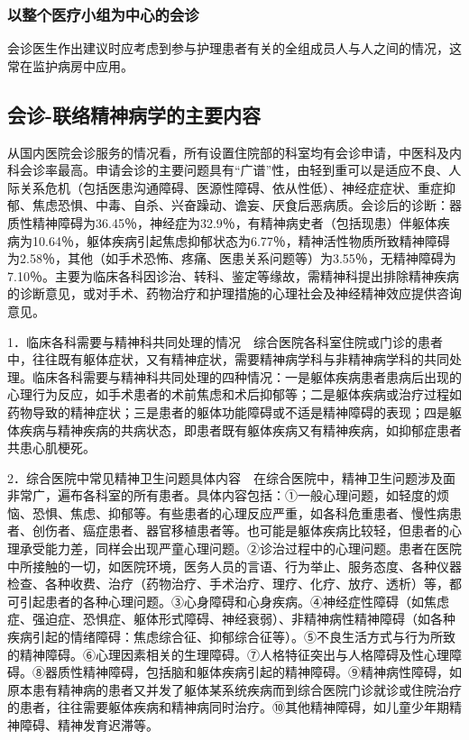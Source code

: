 \subsubsection{以整个医疗小组为中心的会诊}

会诊医生作出建议时应考虑到参与护理患者有关的全组成员人与人之间的情况，这常在监护病房中应用。

\subsection{会诊-联络精神病学的主要内容}

从国内医院会诊服务的情况看，所有设置住院部的科室均有会诊申请，中医科及内科会诊率最高。申请会诊的主要问题具有``广谱''性，由轻到重可以是适应不良、人际关系危机（包括医患沟通障碍、医源性障碍、依从性低）、神经症症状、重症抑郁、焦虑恐惧、中毒、自杀、兴奋躁动、谵妄、厌食后恶病质。会诊后的诊断：器质性精神障碍为36.45％，神经症为32.9％，有精神病史者（包括现患）伴躯体疾病为10.64％，躯体疾病引起焦虑抑郁状态为6.77％，精神活性物质所致精神障碍为2.58％，其他（如手术恐怖、疼痛、医患关系问题等）为3.55％，无精神障碍为7.10％。主要为临床各科因诊治、转科、鉴定等缘故，需精神科提出排除精神疾病的诊断意见，或对手术、药物治疗和护理措施的心理社会及神经精神效应提供咨询意见。

1．临床各科需要与精神科共同处理的情况　综合医院各科室住院或门诊的患者中，往往既有躯体症状，又有精神症状，需要精神病学科与非精神病学科的共同处理。临床各科需要与精神科共同处理的四种情况：一是躯体疾病患者患病后出现的心理行为反应，如手术患者的术前焦虑和术后抑郁等；二是躯体疾病或治疗过程如药物导致的精神症状；三是患者的躯体功能障碍或不适是精神障碍的表现；四是躯体疾病与精神疾病的共病状态，即患者既有躯体疾病又有精神疾病，如抑郁症患者共患心肌梗死。

2．综合医院中常见精神卫生问题具体内容　在综合医院中，精神卫生问题涉及面非常广，遍布各科室的所有患者。具体内容包括：①一般心理问题，如轻度的烦恼、恐惧、焦虑、抑郁等。有些患者的心理反应严重，如各科危重患者、慢性病患者、创伤者、癌症患者、器官移植患者等。也可能是躯体疾病比较轻，但患者的心理承受能力差，同样会出现严童心理问题。②诊治过程中的心理问题。患者在医院中所接触的一切，如医院环境，医务人员的言语、行为举止、服务态度、各种仪器检查、各种收费、治疗（药物治疗、手术治疗、理疗、化疗、放疗、透析）等，都可引起患者的各种心理问题。③心身障碍和心身疾病。④神经症性障碍（如焦虑症、强迫症、恐惧症、躯体形式障碍、神经衰弱）、非精神病性精神障碍（如各种疾病引起的情绪障碍：焦虑综合征、抑郁综合征等）。⑤不良生活方式与行为所致的精神障碍。⑥心理因素相关的生理障碍。⑦人格特征突出与人格障碍及性心理障碍。⑧器质性精神障碍，包括脑和躯体疾病引起的精神障碍。⑨精神病性障碍，如原本患有精神病的患者又并发了躯体某系统疾病而到综合医院门诊就诊或住院治疗的患者，往往需要躯体疾病和精神病同时治疗。⑩其他精神障碍，如儿童少年期精神障碍、精神发育迟滞等。

